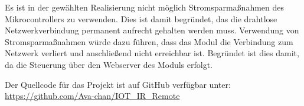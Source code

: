 Es ist in der gewählten Realisierung nicht möglich Stromsparmaßnahmen des Mikrocontrollers zu verwenden.
Dies ist damit begründet, das die drahtlose Netzwerkverbindung permanent aufrecht gehalten werden muss.
Verwendung von Stromsparmaßnahmen würde dazu führen, dass das Modul die Verbindung zum Netzwerk verliert und anschließend nicht erreichbar ist.
Begründet ist dies damit, da die Steuerung über den Webserver des Moduls erfolgt.

Der Quellcode für das Projekt ist auf GitHub verfügbar unter:\\ \url{https://github.com/Ava-chan/IOT_IR_Remote}


\pagestyle{empty}										%
